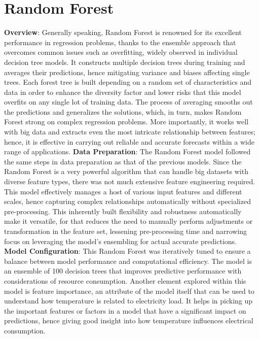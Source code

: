\documentclass[12pt, a4paper,twoside]{report}
\theoremstyle{plain} %
\theoremstyle{definition} %
\theoremstyle{remark} %
\numberwithin{equation}{chapter}
\begin{document}
\section{Random Forest}\label{sec:3.4}
\textbf{Overview}:
\newline
Generally speaking, Random Forest is renowned for its excellent performance in regression problems, thanks to the ensemble approach that overcomes common issues such as overfitting, widely observed in individual decision tree models. It constructs multiple decision trees during training and averages their predictions, hence mitigating variance and biases affecting single trees. Each forest tree is built depending on a random set of characteristics and data in order to enhance the diversity factor and lower risks that this model overfits on any single lot of training data. The process of averaging smooths out the predictions and generalizes the solutions, which, in turn, makes Random Forest strong on complex regression problems. More importantly, it works well with big data and extracts even the most intricate relationship between features; hence, it is effective in carrying out reliable and accurate forecasts within a wide range of applications.
\newline
\textbf{Data Preparation}:
\newline
The Random Forest model followed the same steps in data preparation as that of the previous models. Since the Random Forest is a very powerful algorithm that can handle big datasets with diverse feature types, there was not much extensive feature engineering required. This model effectively manages a host of various input features and different scales, hence capturing complex relationships automatically without specialized pre-processing. This inherently built flexibility and robustness automatically make it versatile, for that reduces the need to manually perform adjustments or transformation in the feature set, lessening pre-processing time and narrowing focus on leveraging the model's ensembling for actual accurate predictions.
\newline
\textbf{Model Configuration}:
\newline
This Random Forest was iteratively tuned to ensure a balance between model performance and computational efficiency. The model is an ensemble of 100 decision trees that improves predictive performance with considerations of resource consumption. Another element explored within this model is feature importance, an attribute of the model itself that can be used to understand how temperature is related to electricity load. It helps in picking up the important features or factors in a model that have a significant impact on predictions, hence giving good insight into how temperature influences electrical consumption.
\end{document}
